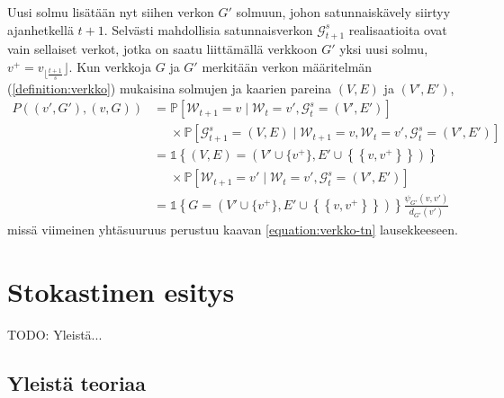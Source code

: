 \documentclass[finnish, 12pt, a4paper, sci, utf8, pdfa]{aaltothesis}
\newcommand{\Grandom}{\mathcal{G}}
\newcommand{\Wrandom}{\mathcal{W}}
\newcommand{\indicator}{\mathopen{\mathds{1}}}
\newcommand*{\prob}{\mathbb{P}}
\begin{document}
Uusi solmu lisätään nyt siihen verkon $ G' $ solmuun, johon satunnaiskävely siirtyy ajanhetkellä $ t + 1 $. Selvästi mahdollisia satunnaisverkon $ \Grandom^{s}_{t+1} $ realisaatioita ovat vain sellaiset verkot, jotka on saatu liittämällä verkkoon $ G' $ yksi uusi solmu, $ v^{+} = v_{\lfloor \frac{t+1}{s}} \rfloor $. Kun verkkoja $ G $ ja $ G' $ merkitään verkon määritelmän (\ref{definition:verkko}) mukaisina solmujen ja kaarien pareina $ (V, E) $ ja $ (V', E') $,
\begin{align*}
   P\left( (v', G'), (v, G) \right) &= \prob \left[ \Wrandom_{t+1} = v \mid \Wrandom_{t} = v', \Grandom^{s}_{t} = (V', E') \right] \\
           &\mathrel{\phantom{=}} \times \prob \left[ \Grandom^{s}_{t+1} = (V, E) \mid \Wrandom_{t+1} = v, \Wrandom_{t} = v', \Grandom^{s}_{t} = (V', E') \right] \\
           &= \indicator \left\{ (V, E) = (V' \cup \{ v^{+} \}, E' \cup \left\{ \left\{ v, v^{+} \right\} \right\}) \right\} \\
           &\mathrel{\phantom{=}} \times \prob \left[ \Wrandom_{t+1} = v' \mid \Wrandom_{t} = v', \Grandom^{s}_{t} = (V', E') \right] \\
           &= \indicator \left\{ G = (V' \cup \{ v^{+} \}, E' \cup \left\{ \left\{ v, v^{+} \right\} \right\}) \right\} \frac{\psi_{G'}(v, v')}{d_{G'}(v')}
\end{align*}
missä viimeinen yhtäsuuruus perustuu kaavan \ref{equation:verkko-tn} lausekkeeseen.

\section{Stokastinen esitys}

TODO: Yleistä...

\subsection{Yleistä teoriaa}
\end{document}

